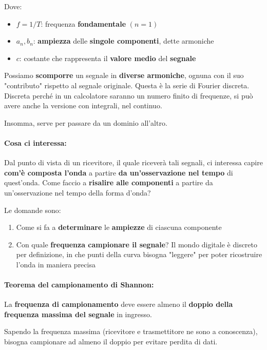 Dove: 
\begin{itemize}
	\item $f=1/T$: frequenza \textbf{fondamentale} $(n=1)$
	
    \item $a_n, b_n$: \textbf{ampiezza} delle \textbf{singole componenti}, dette armoniche
	
    \item $c$: costante che rappresenta il \textbf{valore medio} del \textbf{segnale}
\end{itemize}

Possiamo \textbf{scomporre} un segnale in \textbf{diverse armoniche}, ognuna con il suo "contributo" rispetto al segnale originale. Questa è la serie di Fourier discreta. Discreta perché in un calcolatore saranno un numero finito di frequenze, si può avere anche la versione con integrali, nel continuo.

Insomma, serve per passare da un dominio all'altro.

\paragraph{Cosa ci interessa:} Dal punto di vista di un ricevitore, il quale riceverà tali segnali, ci interessa capire \textbf{com'è composta l'onda} a partire \textbf{da un'osservazione nel tempo} di quest'onda. Come faccio a \textbf{risalire alle componenti} a partire da un'osservazione nel tempo della forma d'onda? 

Le domande sono: 
\begin{enumerate}
	\item Come si fa a \textbf{determinare} le \textbf{ampiezze} di ciascuna componente
	
    \item Con quale \textbf{frequenza campionare il segnale}? Il mondo digitale è discreto per definizione, in che punti della curva bisogna "leggere" per poter ricostruire l'onda in maniera precisa
\end{enumerate}

\paragraph{Teorema del campionamento di Shannon:} La \textbf{frequenza di campionamento} deve essere almeno il \textbf{doppio della frequenza massima del segnale} in ingresso.
\label{par:shannon}

Sapendo la frequenza massima (ricevitore e trasmettitore ne sono a conoscenza), bisogna campionare ad almeno il doppio per evitare perdita di dati.

